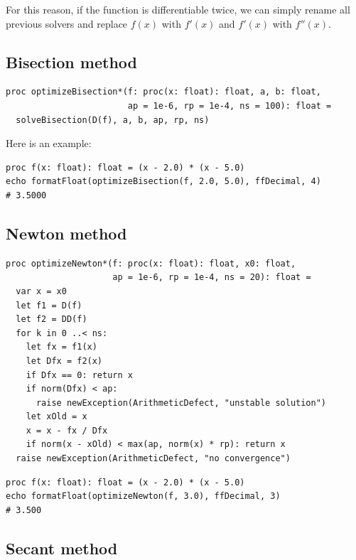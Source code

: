 \documentclass[justified, sixbynine]{tufte-book}
\def\ft{\small\tt}
\theoremstyle{plain}%
\newtheorem * {corollary}{Corollary}
\theoremstyle{definition}
\theoremstyle{remark}
\newtheorem * {remark}{Remark}
\newtheorem * {note}{Note}
\begin{document}
\begin{fullwidth}
For this reason, if the function is differentiable twice, we can simply rename all previous solvers and replace $f(x)$ with $f'(x)$ and $f'(x)$ with $f''(x)$.

\goodbreak\subsection{Bisection method}


\begin{lstlisting}[caption={in file: {\ft nlib.nim}}]
proc optimizeBisection*(f: proc(x: float): float, a, b: float,
                        ap = 1e-6, rp = 1e-4, ns = 100): float =
  solveBisection(D(f), a, b, ap, rp, ns)
\end{lstlisting}

Here is an example:

\begin{lstlisting}
proc f(x: float): float = (x - 2.0) * (x - 5.0)
echo formatFloat(optimizeBisection(f, 2.0, 5.0), ffDecimal, 4)
# 3.5000
\end{lstlisting}

\goodbreak\subsection{Newton method}


\begin{lstlisting}[caption={in file: {\ft nlib.nim}}]
proc optimizeNewton*(f: proc(x: float): float, x0: float,
                     ap = 1e-6, rp = 1e-4, ns = 20): float =
  var x = x0
  let f1 = D(f)
  let f2 = DD(f)
  for k in 0 ..< ns:
    let fx = f1(x)
    let Dfx = f2(x)
    if Dfx == 0: return x
    if norm(Dfx) < ap:
      raise newException(ArithmeticDefect, "unstable solution")
    let xOld = x
    x = x - fx / Dfx
    if norm(x - xOld) < max(ap, norm(x) * rp): return x
  raise newException(ArithmeticDefect, "no convergence")
\end{lstlisting}

\begin{lstlisting}
proc f(x: float): float = (x - 2.0) * (x - 5.0)
echo formatFloat(optimizeNewton(f, 3.0), ffDecimal, 3)
# 3.500
\end{lstlisting}

\goodbreak\subsection{Secant method}


\end{fullwidth}
\end{document}
